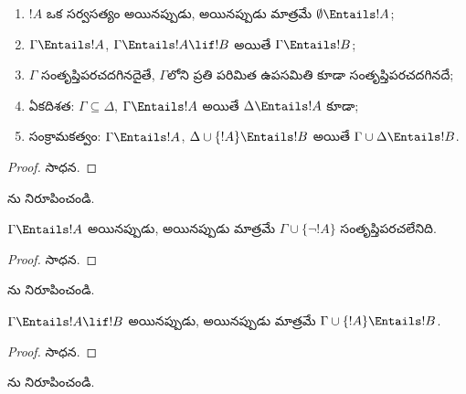 \documentclass[../../../include/open-logic-section]{subfiles}
\begin{document}
\begin{prop}
\begin{enumerate}
\item $!A$ ఒక సర్వసత్యం అయినప్పుడు, అయినప్పుడు మాత్రమే
  $\emptyset \Entails !A$;
\item $\Gamma \Entails !A$, $\Gamma \Entails !A \lif !B$ అయితే
  $\Gamma \Entails !B$;
\item $\Gamma$ సంతృప్తిపరచదగినదైతే, $\Gamma$లోని ప్రతి పరిమిత
  ఉపసమితి కూడా సంతృప్తిపరచదగినదే;
\item {} ఏకదిశత: $\Gamma \subseteq \Delta$,
  $\Gamma \Entails !A$ అయితే $\Delta \Entails !A$ కూడా;
\item {} సంక్రామకత్వం: $\Gamma \Entails !A$,
  $\Delta \cup \{ !A\} \Entails !B$ అయితే
  $\Gamma \cup \Delta \Entails !B$.
\end{enumerate}
\end{prop}

\begin{proof}
సాధన.
\end{proof}

\begin{prob}
ను నిరూపించండి.
\end{prob}

\begin{prop}
  $\Gamma \Entails !A$ అయినప్పుడు, అయినప్పుడు మాత్రమే
  $\Gamma \cup \{\lnot !A\}$ సంతృప్తిపరచలేనిది.
\end{prop}

\begin{proof}
సాధన.
\end{proof}

\begin{prob}
ను నిరూపించండి.
\end{prob}

\begin{thm}
   $\Gamma \Entails !A \lif !B$
  అయినప్పుడు, అయినప్పుడు మాత్రమే $\Gamma \cup \{!A\} \Entails !B$.
\end{thm}

\begin{proof}
సాధన.
\end{proof}

\begin{prob}
ను నిరూపించండి.
\end{prob}
\end{document}
